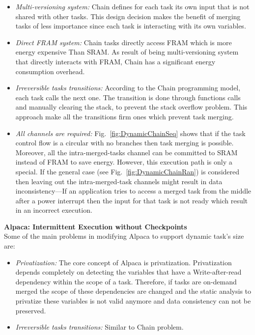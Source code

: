 \documentclass[sigconf,anonymous,review]{acmart}
\begin{document}
\begin{itemize}
	\item \emph{Multi-versioning system:} Chain defines for each task its own input that is not shared with other tasks. This design decision makes the benefit of merging tasks of less importance since each task is interacting with its own variables. 
	\item \emph{Direct FRAM system:} Chain tasks directly access FRAM which is more energy expensive Than SRAM. As result of being multi-versioning system that directly interacts with FRAM, Chain has a significant energy consumption overhead. 
	\item \emph{Irreversible tasks transitions:} According to the Chain programming model, each task calls the next one. The transition is done through functions calls and manually clearing the stack, to prevent the stack overflow problem. This approach make all the transitions firm ones which prevent task merging.
	\item \emph{All channels are required:} Fig.~\ref{fig:DynamicChainSeq} shows that if the task control flow is a circular with no branches then task merging is possible. Moreover, all the intra-merged-tasks channel can be committed to SRAM instead of FRAM to save energy. However, this execution path is only a special. If the general case (see Fig.~\ref{fig:DynamicChainRan}) is considered then leaving out the intra-merged-task channels might result in data inconsistency---If an application tries to access a merged task from the middle after a power interrupt then the input for that task is not ready which result in an incorrect execution. 


\end{itemize}


\noindent\textbf{Alpaca: Intermittent Execution without Checkpoints} \\
Some of the main problems in modifying Alpaca to support dynamic task's size are:

\begin{itemize}
	\item \emph{Privatization:} The core concept of Alpaca is privatization. Privatization depends completely on detecting the variables that have a Write-after-read dependency within the scope of a task. Therefore, if tasks are on-demand merged the scope of these dependencies are changed and the static analysis to privatize these variables is not valid anymore and data consistency can not be preserved.  

	\item \emph{Irreversible tasks transitions:} Similar to Chain problem. 

\end{itemize}
\end{document}
